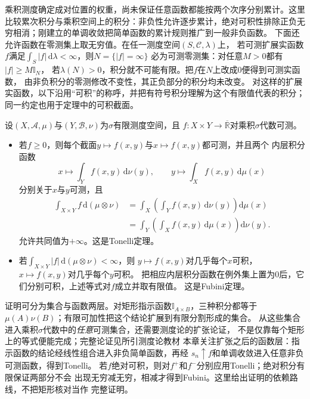 乘积测度确定成对位置的权重，尚未保证任意函数都能按两个次序分别累计。这里比较累次积分与乘积空间上的积分：非负性允许逐步累计，绝对可积性排除正负无穷相消；刚建立的单调收敛把简单函数的累计规则推广到一般非负函数。
下面还允许函数在零测集上取无穷值。在任一测度空间$(S,\mathcal C,\lambda)$上，
若可测扩展实函数$f$满足$\int_S|f|\,\mathrm d\lambda<\infty$，则$N=\{|f|=\infty\}$
必为可测零测集：对任意$M>0$都有$|f|\geq M\mathbb I_N$，
若$\lambda(N)>0$，积分就不可能有限。把$f$在$N$上改成$0$便得到可测实函数，
由非负积分的零测修改不变性，其正负部分的积分均未改变。
对这样的扩展实函数，以下沿用“可积”的称呼，并把有符号积分理解为这个有限值代表的积分；
同一约定也用于定理中的可积截面。
\begin{theorem}[Tonelli与Fubini定理]
\label{thm:analysis-tonelli-fubini}
设$(X,\mathcal{A},\mu)$与$(Y,\mathcal{B},\nu)$为$\sigma$有限测度空间，且 $f:X\times Y\to\overline{\mathbb{R}}$对乘积$\sigma$代数可测。
\begin{itemize}

\item 若$f\geq0$，则每个截面$y\mapsto f(x,y)$与$x\mapsto f(x,y)$都可测，并且两个
  内层积分函数
  \[
    x\longmapsto\int_Yf(x,y)\,\mathrm{d}\nu(y),
    \qquad
    y\longmapsto\int_Xf(x,y)\,\mathrm{d}\mu(x)
  \]
  分别关于$x$与$y$可测，且
  \[
    \begin{aligned}
      \int_{X\times Y}f\,\mathrm{d}(\mu\otimes\nu)
      &=
      \int_X\left(\int_Yf(x,y)\,\mathrm{d}\nu(y)\right)\mathrm{d}\mu(x)\\
      &=
      \int_Y\left(\int_Xf(x,y)\,\mathrm{d}\mu(x)\right)\mathrm{d}\nu(y).
    \end{aligned}
  \]
  允许共同值为$+\infty$。这是Tonelli定理。
\item 若$\int_{X\times Y}|f|\,\mathrm{d}(\mu\otimes\nu)<\infty$，则
  $y\mapsto f(x,y)$对几乎每个$x$可积，$x\mapsto f(x,y)$对几乎每个$y$可积。
  把相应内层积分函数在例外集上置为$0$后，它们分别可积，上述等式对$f$成立并取有限值。
  这是Fubini定理。
\end{itemize}
\end{theorem}

证明可分为集合与函数两层。对矩形指示函数$\mathbb I_{A\times B}$，三种积分都等于
$\mu(A)\nu(B)$；有限可加性把这个结论扩展到有限分割形成的集合。
从这些集合进入乘积$\sigma$代数中的\emph{任意}可测集合，还需要测度论的扩张论证，
不是仅靠每个矩形上的等式便能完成；完整论证见所引测度论教材
本章关注扩张之后的函数层：指示函数的结论经线性组合进入非负简单函数，再经
$s_n\uparrow f$和单调收敛进入任意非负可测函数，得到Tonelli。
若$f$绝对可积，则对$f^+$和$f^-$分别应用Tonelli；绝对积分有限保证两部分不会
出现无穷减无穷，相减才得到Fubini。这里给出证明的依赖路线，不把矩形核对当作
完整证明。

